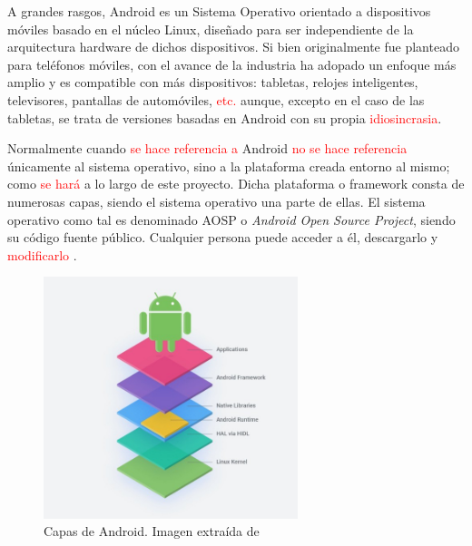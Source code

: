         A grandes rasgos, Android es un Sistema Operativo orientado a dispositivos móviles basado en el núcleo 
        Linux, diseñado para ser independiente de la arquitectura hardware de dichos dispositivos. 
        Si bien originalmente fue planteado para teléfonos móviles, con el avance de la industria ha adopado 
        un enfoque más amplio y es compatible con más dispositivos: tabletas, relojes inteligentes, televisores, 
        pantallas de automóviles, \textcolor{red}{etc.} %
        aunque, excepto en el caso de las tabletas, se trata de versiones basadas en
        Android con su propia %
        \textcolor{red}{idiosincrasia}. 

        Normalmente cuando \textcolor{red}{se hace referencia a} %
        Android \textcolor{red}{no se hace referencia} %
        únicamente al sistema operativo, sino a la
        plataforma creada entorno al mismo; como \textcolor{red}{se hará} %
        a lo largo de este proyecto. Dicha plataforma o 
        \gls{framework} consta de numerosas capas, siendo el sistema operativo una parte de ellas. El sistema 
        operativo como tal es denominado AOSP o \textit{Android Open Source Project}, siendo su código fuente 
        público. Cualquier persona puede acceder a él, descargarlo y \textcolor{red}{modificarlo} %
        \cite{collado_que_2022}.

        \begin{figure}[h]
            \centering
            \includegraphics[width=0.66\textwidth]{figures/Android capas.jpg}
            \caption[Capas de Android.]
            {Capas de Android. Imagen extraída de \cite{perez_aosp_2019}}
            \label{figure:android:capas}
        \end{figure}


